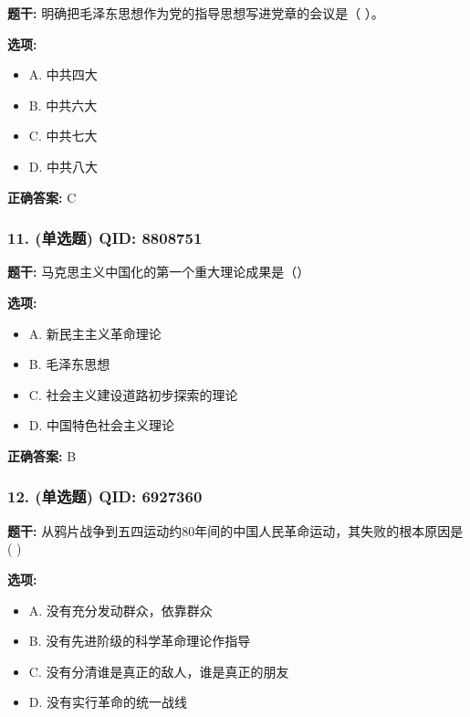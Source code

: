 \documentclass[12pt,UTF8]{ctexart}
\begin{document}
\textbf{题干:}
明确把毛泽东思想作为党的指导思想写进党章的会议是（ ）。

\textbf{选项:}
\begin{itemize}[leftmargin=*]

  \item A. 中共四大

  \item B. 中共六大

  \item C. 中共七大

  \item D. 中共八大

\end{itemize}

\textbf{正确答案:}
C

\vspace{0.3em}\hrulefill\vspace{0.7em}

\subsubsection*{11. (单选题) \small QID: 8808751}

\textbf{题干:}
马克思主义中国化的第一个重大理论成果是（）

\textbf{选项:}
\begin{itemize}[leftmargin=*]

  \item A. 新民主主义革命理论

  \item B. 毛泽东思想

  \item C. 社会主义建设道路初步探索的理论

  \item D. 中国特色社会主义理论

\end{itemize}

\textbf{正确答案:}
B

\vspace{0.3em}\hrulefill\vspace{0.7em}

\subsubsection*{12. (单选题) \small QID: 6927360}

\textbf{题干:}
从鸦片战争到五四运动约80年间的中国人民革命运动，其失败的根本原因是(   )

\textbf{选项:}
\begin{itemize}[leftmargin=*]

  \item A. 没有充分发动群众，依靠群众

  \item B. 没有先进阶级的科学革命理论作指导

  \item C. 没有分清谁是真正的敌人，谁是真正的朋友

  \item D. 没有实行革命的统一战线

\end{itemize}
\end{document}
